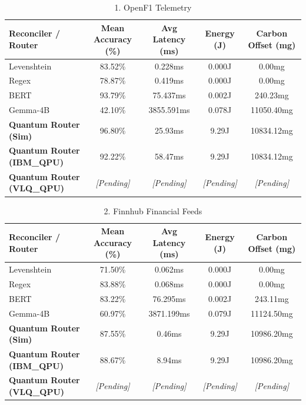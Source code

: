 
\begin{table}[htbp]
  \centering
  \caption{1. OpenF1 Telemetry}
  \label{tab:1__openf1_telemetry}
  \begin{tabular}{lcccc}
    \hline
    \textbf{Reconciler / Router} & \textbf{Mean Accuracy (\%)} & \textbf{Avg Latency (ms)} & \textbf{Energy (J)} & \textbf{Carbon Offset (mg)} \\
    \hline
    Levenshtein & 83.52\% & 0.228ms & 0.000J & 0.00mg \\
    Regex & 78.87\% & 0.419ms & 0.000J & 0.00mg \\
    BERT & 93.79\% & 75.437ms & 0.002J & 240.23mg \\
    Gemma-4B & 42.10\% & 3855.591ms & 0.078J & 11050.40mg \\
    \textbf{Quantum Router (Sim)} & 96.80\% & 25.93ms & 9.29J & 10834.12mg \\
    \textbf{Quantum Router (IBM\_QPU)} & 92.22\% & 58.47ms & 9.29J & 10834.12mg \\
    \textbf{Quantum Router (VLQ\_QPU)} & \textit{[Pending]} & \textit{[Pending]} & \textit{[Pending]} & \textit{[Pending]} \\
    \hline
  \end{tabular}
\end{table}



\begin{table}[htbp]
  \centering
  \caption{2. Finnhub Financial Feeds}
  \label{tab:2__finnhub_financial_feeds}
  \begin{tabular}{lcccc}
    \hline
    \textbf{Reconciler / Router} & \textbf{Mean Accuracy (\%)} & \textbf{Avg Latency (ms)} & \textbf{Energy (J)} & \textbf{Carbon Offset (mg)} \\
    \hline
    Levenshtein & 71.50\% & 0.062ms & 0.000J & 0.00mg \\
    Regex & 83.88\% & 0.068ms & 0.000J & 0.00mg \\
    BERT & 83.22\% & 76.295ms & 0.002J & 243.11mg \\
    Gemma-4B & 60.97\% & 3871.199ms & 0.079J & 11124.50mg \\
    \textbf{Quantum Router (Sim)} & 87.55\% & 0.46ms & 9.29J & 10986.20mg \\
    \textbf{Quantum Router (IBM\_QPU)} & 88.67\% & 8.94ms & 9.29J & 10986.20mg \\
    \textbf{Quantum Router (VLQ\_QPU)} & \textit{[Pending]} & \textit{[Pending]} & \textit{[Pending]} & \textit{[Pending]} \\
    \hline
  \end{tabular}
\end{table}


